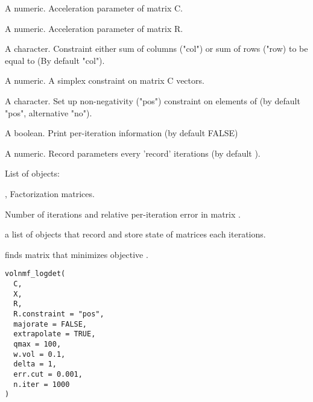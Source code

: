 \documentclass[letterpaper]{book}
\begin{document}
\begin{Arguments}
\begin{ldescription}
\item[\code{acc.C}] A numeric. Acceleration parameter of matrix C.

\item[\code{acc.R}] A numeric. Acceleration parameter of matrix R.

\item[\code{C.constraint}] A character. Constraint either sum of columns ("col") or sum of rows ("row) to be equal to  (By default "col").

\item[\code{C.bound}] A numeric. A simplex constraint on matrix C vectors.

\item[\code{R.constraint}] A character. Set up non-negativity ("pos") constraint on elements of  (by default "pos", alternative "no").

\item[\code{verbose}] A boolean. Print per-iteration information (by default FALSE)

\item[\code{record}] A numeric. Record parameters every 'record' iterations (by default ).
\end{ldescription}
\end{Arguments}
%
\begin{Value}
List of objects:

,  Factorization matrices.

 Number of iterations and relative per-iteration error  in matrix .

 a list of objects that record and store state of matrices each  iterations.
\end{Value}
%
\begin{Description}\relax
{} finds matrix  that minimizes objective
.
\end{Description}
%
\begin{Usage}
\begin{verbatim}
volnmf_logdet(
  C,
  X,
  R,
  R.constraint = "pos",
  majorate = FALSE,
  extrapolate = TRUE,
  qmax = 100,
  w.vol = 0.1,
  delta = 1,
  err.cut = 0.001,
  n.iter = 1000
)
\end{verbatim}
\end{Usage}
\end{document}
